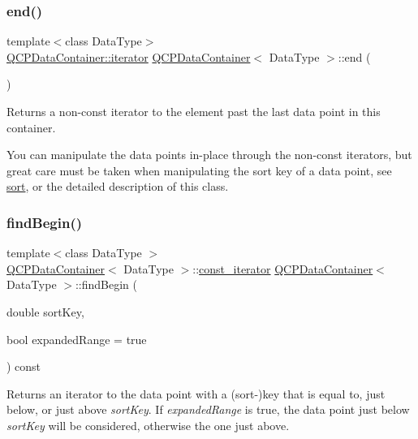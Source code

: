 \subsubsection{\texorpdfstring{end()}{end()}}
{\footnotesize\ttfamily template$<$class Data\+Type$>$ \\
\mbox{\hyperlink{class_q_c_p_data_container_a1bb453c3ae37d1ee5268878acb3a9d29}{Q\+C\+P\+Data\+Container\+::iterator}} \mbox{\hyperlink{class_q_c_p_data_container}{Q\+C\+P\+Data\+Container}}$<$ Data\+Type $>$\+::end (\begin{DoxyParamCaption}{ }\end{DoxyParamCaption})\hspace{0.3cm}{\ttfamily [inline]}}

Returns a non-\/const iterator to the element past the last data point in this container.

You can manipulate the data points in-\/place through the non-\/const iterators, but great care must be taken when manipulating the sort key of a data point, see \mbox{\hyperlink{class_q_c_p_data_container_a75da92e33063b63d6da5014683591d45}{sort}}, or the detailed description of this class. \mbox{\label{class_q_c_p_data_container_a2ad8a5399072d99a242d3a6d2d7e278a}} 
\subsubsection{\texorpdfstring{findBegin()}{findBegin()}}
{\footnotesize\ttfamily template$<$class Data\+Type $>$ \\
\mbox{\hyperlink{class_q_c_p_data_container}{Q\+C\+P\+Data\+Container}}$<$ Data\+Type $>$\+::\mbox{\hyperlink{class_q_c_p_data_container_ae40a91f5cb0bcac61d727427449b7d15}{const\+\_\+iterator}} \mbox{\hyperlink{class_q_c_p_data_container}{Q\+C\+P\+Data\+Container}}$<$ Data\+Type $>$\+::find\+Begin (\begin{DoxyParamCaption}\item[{double}]{sort\+Key,  }\item[{bool}]{expanded\+Range = {\ttfamily true} }\end{DoxyParamCaption}) const}

Returns an iterator to the data point with a (sort-\/)key that is equal to, just below, or just above {\itshape sort\+Key}. If {\itshape expanded\+Range} is true, the data point just below {\itshape sort\+Key} will be considered, otherwise the one just above.

